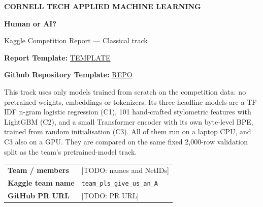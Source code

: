 \documentclass[11pt,letterpaper]{article}
\begin{document}
\thispagestyle{empty}
\vspace*{0.2in}
{\color{teal}\bfseries CORNELL TECH \textbar{} APPLIED MACHINE LEARNING}\par
\vspace{0.15in}
{\Huge\bfseries\color{navy} Human or AI?}\par
\vspace{0.07in}
{\LARGE\color{navy} Kaggle Competition Report --- Classical track}\par
\vspace{0.17in}

\textbf{Report Template: }\href{https://www.overleaf.com/project/6ae1fc85355dcf680137d898/share#f2777b20d3adeeecfac9096f78008e2f8daa0ff4be43de3b}{TEMPLATE}

\textbf{Github Repository Template: }\href{https://github.com/sekhari/human-or-ai-submissions}{REPO}

\noindent{}

This track uses only models trained from scratch on the competition data: no pretrained weights, embeddings or tokenizers. Its three headline models are a TF-IDF n-gram logistic regression (C1), 101 hand-crafted stylometric features with LightGBM (C2), and a small Transformer encoder with its own byte-level BPE, trained from random initialisation (C3). All of them run on a laptop CPU, and C3 also on a GPU. They are compared on the same fixed 2,000-row validation split as the team's pretrained-model track.

\vspace{0.06in}
\begin{tabularx}{\linewidth}{@{}>{\bfseries}p{1.58in}Y@{}}
Team / members & [TODO: names and NetIDs] \\
Kaggle team name & \texttt{team\_pls\_give\_us\_an\_A} \\
GitHub PR URL & [TODO: PR URL] \\
\end{tabularx}
\vspace{0.06in}
\end{document}
